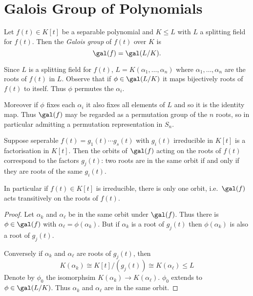\documentclass[a4paper]{article}
\begin{document}
\section{Galois Group of Polynomials}

\begin{definition}
  Let \(f(t) \in K[t]\) be a separable polynomial and \(K \leq L\) with \(L\) a splitting field for \(f(t)\). Then the \emph{Galois group} of \(f(t)\) over \(K\) is
  \[
    \gal(f) = \gal(L/K).
  \]
\end{definition}

Since \(L\) is a splitting field for \(f(t)\), \(L = K(\alpha_1, \dots, \alpha_n)\) where \(\alpha_1, \dots, \alpha_n\) are the roots of \(f(t)\) in \(L\). Observe that if \(\phi \in \gal(L/K)\) it maps bijectively roots of \(f(t)\) to itself. Thus \(\phi\) permutes the \(\alpha_i\).

Moreover if \(\phi\) fixes each \(\alpha_i\) it also fixes all elements of \(L\) and so it is the identity map. Thus \(\gal(f)\) may be regarded as a permutation group of the \(n\) roots, so in particular admitting a permutation representation in \(S_n\).

\begin{lemma}
  \label{lem:galois orbits}
  Suppose seperable \(f(t) = g_1(t) \cdots g_s(t)\) with \(g_i(t)\) irreducible in \(K[t]\) is a factorisation in \(K[t]\). Then the orbits of \(\gal(f)\) acting on the roots of \(f(t)\) correspond to the factors \(g_j(t)\): two roots are in the same orbit if and only if they are roots of the same \(g_i(t)\).

  In particular if \(f(t) \in K[t]\) is irreducible, there is only one orbit, i.e.\ \(\gal(f)\) acts transitively on the roots of \(f(t)\).
\end{lemma}

\begin{proof}
  Let \(\alpha_k\) and \(\alpha_\ell\) be in the same orbit under \(\gal(f)\). Thus there is \(\phi \in \gal(f)\) with \(\alpha_\ell = \phi(\alpha_k)\). But if \(\alpha_k\) is a root of \(g_j(t)\) then \(\phi(\alpha_k)\) is also a root of \(g_j(t)\).

  Conversely if \(\alpha_k\) and \(\alpha_\ell\) are roots of \(g_j(t)\), then
  \[
    K(\alpha_k) \cong K[t]/(g_j(t)) \cong K(\alpha_\ell) \leq L
  \]
  Denote by \(\phi_0\) the isomorphsim \(K(\alpha_k) \to K(\alpha_\ell)\). \(\phi_0\) extends to \(\phi \in \gal(L/K)\). Thus \(\alpha_k\) and \(\alpha_\ell\) are in the same orbit.
\end{proof}
\end{document}
